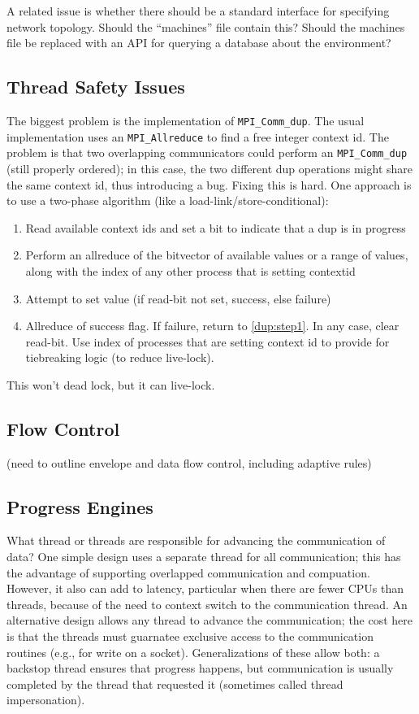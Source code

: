 \documentclass{article}
\begin{document}
A related issue is whether there should be a standard interface for specifying
network topology.  Should the ``machines'' file contain this?  Should the
machines file be replaced with an API for querying a database about the
environment?

\subsection{Thread Safety Issues}
The biggest problem is the implementation of \texttt{MPI\_Comm\_dup}.  The
usual implementation uses an \texttt{MPI\_Allreduce} to find a free integer
context id.  The problem is that two overlapping communicators could perform an
\texttt{MPI\_Comm\_dup} (still properly ordered); in this case, the two
different dup operations might share the same context id, thus introducing a
bug.  Fixing this is hard.  One approach is to use a two-phase algorithm (like
a load-link/store-conditional):
\begin{enumerate}
\item Read available context ids and set a bit to indicate that a dup is in
  progress\label{dup:step1}
\item Perform an allreduce of the bitvector of available values or a range of
  values, along with the index of any other process that is setting contextid
\item Attempt to set value (if read-bit not set, success, else failure)
\item Allreduce of success flag.  If failure, return to \ref{dup:step1}.
In any case, clear read-bit.  Use index of processes that are setting context
id to provide for tiebreaking logic (to reduce live-lock).
\end{enumerate}
This won't dead lock, but it can live-lock.  

\subsection{Flow Control}
(need to outline envelope and data flow control, including adaptive rules)

\subsection{Progress Engines}
What thread or threads are responsible for advancing the communication of
data?  One simple design uses a separate thread for all communication; this
has the advantage of supporting overlapped communication and compuation.
However, it also can add to latency, particular when there are fewer CPUs than
threads, because of the need to context switch to the communication thread.
An alternative design allows any thread to advance the communication; the cost
here is that the threads must guarnatee exclusive access to the communication
routines (e.g., for write on a socket).  Generalizations of these allow both:
a backstop thread ensures that progress happens, but communication is usually
completed by the thread that requested it (sometimes called thread
impersonation).  
\end{document}

